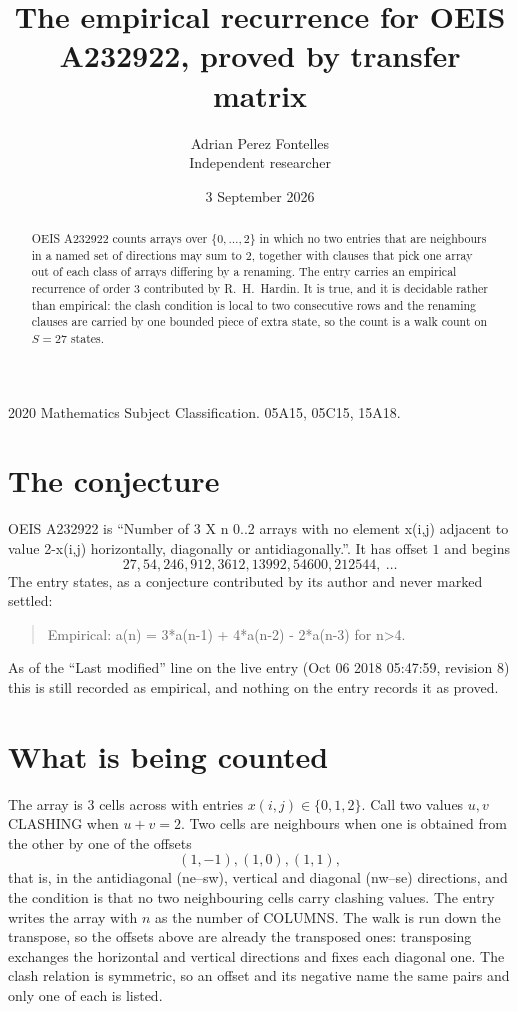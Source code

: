 \documentclass[11pt,a4paper]{article}
\title{The empirical recurrence for OEIS A232922, proved by transfer matrix}
\author{Adrian Perez Fontelles\\ \small Independent researcher}
\date{3 September 2026}
\theoremstyle{plain}
\theoremstyle{definition}
\begin{document}
\maketitle

\begin{abstract}
OEIS A232922 counts arrays over $\{0,\dots,2\}$ in which no two entries that are neighbours in
a named set of directions may sum to $2$, together with clauses that pick one array out of
each class of arrays differing by a renaming. The entry carries an empirical recurrence of
order $3$ contributed by R.~H.~Hardin. It is true, and it is decidable rather than
empirical: the clash condition is local to two consecutive rows and the renaming clauses are
carried by one bounded piece of extra state, so the count is a walk count on $S=27$ states.
\end{abstract}

\noindent\small 2020 Mathematics Subject Classification. 05A15, 05C15, 15A18.\normalsize

\section{The conjecture}

OEIS A232922 is ``Number of 3 X n 0..2 arrays with no element x(i,j) adjacent to value 2-x(i,j) horizontally, diagonally or antidiagonally.''. It has offset $1$ and begins
\[
27, 54, 246, 912, 3612, 13992, 54600, 212544,\ \dots
\]
The entry states, as a conjecture contributed by its author and never marked settled:
\begin{quote}
Empirical: a(n) = 3*a(n-1) + 4*a(n-2) - 2*a(n-3) for n>4.
\end{quote}
As of the ``Last modified'' line on the live entry (Oct 06 2018 05:47:59, revision 8) this is still
recorded as empirical, and nothing on the entry records it as proved.

\section{What is being counted}

The array is $3$ cells across with entries $x(i,j)\in\{0,1,2\}$. Call two values $u,v$ CLASHING
when $u+v=2$. Two cells are neighbours when one is obtained from the other by one of
the offsets
\[
(1,-1), (1,0), (1,1),
\]
that is, in the antidiagonal (ne--sw), vertical and diagonal (nw--se) directions, and the condition is that no two neighbouring cells carry
clashing values. The entry writes the array with $n$ as the number of COLUMNS. The walk is run down the transpose, so the offsets above are already the transposed ones: transposing exchanges the horizontal and vertical directions and fixes each diagonal one. The clash relation is symmetric, so an offset and its negative name the
same pairs and only one of each is listed.
\end{document}
